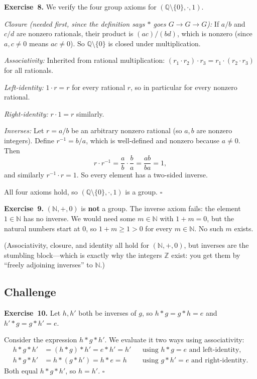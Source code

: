 \documentclass[11pt]{article}
\begin{document}
\medskip
\textbf{Exercise~8.}
We verify the four group axioms for $(\mathbb{Q} \setminus \{0\}, \cdot, 1)$.

\emph{Closure (needed first, since the definition says $*$ goes $G \to G \to G$):} If $a/b$ and $c/d$ are nonzero rationals, their product is $(ac)/(bd)$, which is nonzero (since $a, c \neq 0$ means $ac \neq 0$). So $\mathbb{Q} \setminus \{0\}$ is closed under multiplication.

\emph{Associativity:} Inherited from rational multiplication: $(r_1 \cdot r_2) \cdot r_3 = r_1 \cdot (r_2 \cdot r_3)$ for all rationals.

\emph{Left-identity:} $1 \cdot r = r$ for every rational $r$, so in particular for every nonzero rational.

\emph{Right-identity:} $r \cdot 1 = r$ similarly.

\emph{Inverses:} Let $r = a/b$ be an arbitrary nonzero rational (so $a, b$ are nonzero integers). Define $r^{-1} = b/a$, which is well-defined and nonzero because $a \neq 0$. Then
\[
  r \cdot r^{-1} = \frac{a}{b} \cdot \frac{b}{a} = \frac{ab}{ba} = 1,
\]
and similarly $r^{-1} \cdot r = 1$. So every element has a two-sided inverse.

All four axioms hold, so $(\mathbb{Q} \setminus \{0\}, \cdot, 1)$ is a group. \hfill$\square$

\medskip
\textbf{Exercise~9.}
$(\mathbb{N}, +, 0)$ is \textbf{not} a group. The inverse axiom fails: the element $1 \in \mathbb{N}$ has no inverse. We would need some $m \in \mathbb{N}$ with $1 + m = 0$, but the natural numbers start at $0$, so $1 + m \geq 1 > 0$ for every $m \in \mathbb{N}$. No such $m$ exists.

(Associativity, closure, and identity all hold for $(\mathbb{N}, +, 0)$, but inverses are the stumbling block---which is exactly why the integers $\mathbb{Z}$ exist: you get them by ``freely adjoining inverses'' to $\mathbb{N}$.)

\subsection*{Challenge}

\textbf{Exercise~10.}
Let $h, h'$ both be inverses of $g$, so $h * g = g * h = e$ and $h' * g = g * h' = e$.

Consider the expression $h * g * h'$. We evaluate it two ways using associativity:
\begin{align*}
  h * g * h' &= (h * g) * h' = e * h' = h' && \text{using $h * g = e$ and left-identity,} \\
  h * g * h' &= h * (g * h') = h * e = h && \text{using $g * h' = e$ and right-identity.}
\end{align*}
Both equal $h * g * h'$, so $h = h'$. \hfill$\square$
\end{document}

